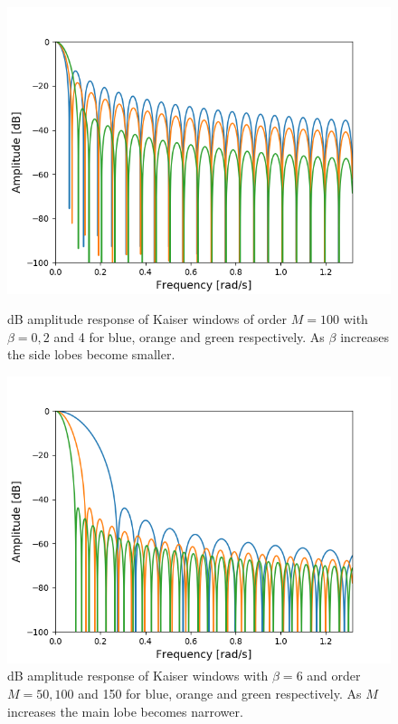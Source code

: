 \begin{figure}[H]
\centering
\begin{minipage}{0.49\textwidth}
\centering
\includegraphics[width=\textwidth]{figures/dbplots/kaiser_beta.png}
\caption{dB amplitude response of Kaiser windows of order $M=100$ with $\beta=0,2$ and 4 for blue, orange and green respectively. As $\beta$ increases the side lobes become smaller.}
\label{fig:kaiser_beta}
\end{minipage}
\begin{minipage}{0.49\textwidth}
\centering
\includegraphics[width=\textwidth]{figures/dbplots/kaiser_order.png}
\caption{dB amplitude response of Kaiser windows with $\beta=6$ and order $M=50,100$ and 150 for blue, orange and green respectively. As $M$ increases the main lobe becomes narrower.}
\label{fig:kaiser_order}
\end{minipage}
\end{figure} 
 
